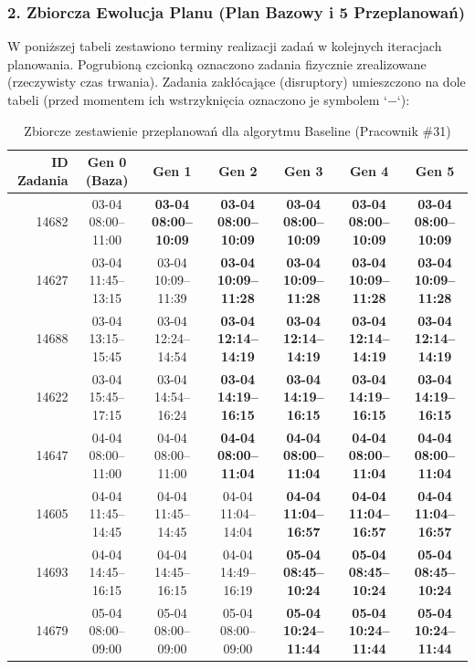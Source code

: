 \subsubsection*{2. Zbiorcza Ewolucja Planu (Plan Bazowy i 5 Przeplanowań)}

W poniższej tabeli zestawiono terminy realizacji zadań w kolejnych iteracjach planowania. Pogrubioną czcionką oznaczono zadania fizycznie zrealizowane (rzeczywisty czas trwania). Zadania zakłócające (disruptory) umieszczono na dole tabeli (przed momentem ich wstrzyknięcia oznaczono je symbolem `$-$`):

\begin{table}[htbp]
\centering\scriptsize
\caption{Zbiorcze zestawienie przeplanowań dla algorytmu Baseline (Pracownik \#31)}
\label{tab:case_study_evolution_baseline_u31}
\begin{tabular}{|r|c|c|c|c|c|c|}
\hline
\textbf{ID Zadania} & \textbf{Gen 0 (Baza)} & \textbf{Gen 1} & \textbf{Gen 2} & \textbf{Gen 3} & \textbf{Gen 4} & \textbf{Gen 5} \\ \hline
14682 & 03-04 08:00--11:00 & \textbf{03-04 08:00--10:09} & \textbf{03-04 08:00--10:09} & \textbf{03-04 08:00--10:09} & \textbf{03-04 08:00--10:09} & \textbf{03-04 08:00--10:09} \\ 
14627 & 03-04 11:45--13:15 & 03-04 10:09--11:39 & \textbf{03-04 10:09--11:28} & \textbf{03-04 10:09--11:28} & \textbf{03-04 10:09--11:28} & \textbf{03-04 10:09--11:28} \\ 
14688 & 03-04 13:15--15:45 & 03-04 12:24--14:54 & \textbf{03-04 12:14--14:19} & \textbf{03-04 12:14--14:19} & \textbf{03-04 12:14--14:19} & \textbf{03-04 12:14--14:19} \\ 
14622 & 03-04 15:45--17:15 & 03-04 14:54--16:24 & \textbf{03-04 14:19--16:15} & \textbf{03-04 14:19--16:15} & \textbf{03-04 14:19--16:15} & \textbf{03-04 14:19--16:15} \\ 
14647 & 04-04 08:00--11:00 & 04-04 08:00--11:00 & \textbf{04-04 08:00--11:04} & \textbf{04-04 08:00--11:04} & \textbf{04-04 08:00--11:04} & \textbf{04-04 08:00--11:04} \\ 
14605 & 04-04 11:45--14:45 & 04-04 11:45--14:45 & 04-04 11:04--14:04 & \textbf{04-04 11:04--16:57} & \textbf{04-04 11:04--16:57} & \textbf{04-04 11:04--16:57} \\ 
14693 & 04-04 14:45--16:15 & 04-04 14:45--16:15 & 04-04 14:49--16:19 & \textbf{05-04 08:45--10:24} & \textbf{05-04 08:45--10:24} & \textbf{05-04 08:45--10:24} \\ 
14679 & 05-04 08:00--09:00 & 05-04 08:00--09:00 & 05-04 08:00--09:00 & \textbf{05-04 10:24--11:44} & \textbf{05-04 10:24--11:44} & \textbf{05-04 10:24--11:44} \\ 

\end{tabular}
\end{table}
